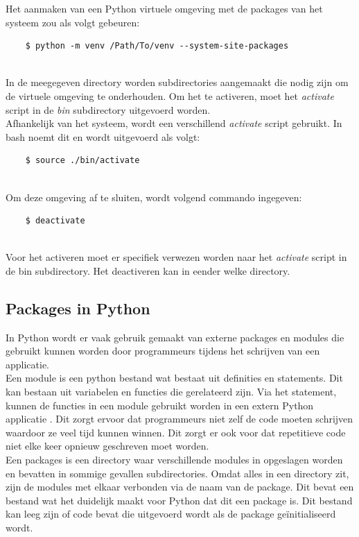 Het aanmaken van een Python virtuele omgeving met de packages van het systeem zou als volgt gebeuren:
\begin{lstlisting}
    $ python -m venv /Path/To/venv --system-site-packages
    
\end{lstlisting}

In de meegegeven directory worden subdirectories aangemaakt die nodig zijn om de virtuele omgeving te onderhouden. Om het te activeren, moet het \textit{activate} script in de \textit{bin} subdirectory uitgevoerd worden. \autocite{PSF2024} \\
Afhankelijk van het systeem, wordt een verschillend \textit{activate} script gebruikt. In bash noemt dit  en wordt uitgevoerd als volgt:
\begin{lstlisting}
    $ source ./bin/activate
    
\end{lstlisting}

Om deze omgeving af te sluiten, wordt volgend commando ingegeven:
\begin{lstlisting}
    $ deactivate
    
\end{lstlisting}

Voor het activeren moet er specifiek verwezen worden naar het \textit{activate} script in de bin subdirectory. Het deactiveren kan in eender welke directory.

\subsection{Packages in Python}
In Python wordt er vaak gebruik gemaakt van externe packages en modules die gebruikt kunnen worden door programmeurs tijdens het schrijven van een applicatie. \\
Een module is een python bestand wat bestaat uit definities en statements. Dit kan bestaan uit variabelen en functies die gerelateerd zijn. Via het  statement, kunnen de functies in een module gebruikt worden in een extern Python applicatie \autocite{Singh2024}. Dit zorgt ervoor dat programmeurs niet zelf de code moeten schrijven waardoor ze veel tijd kunnen winnen. Dit zorgt er ook voor dat repetitieve code niet elke keer opnieuw geschreven moet worden.\\

Een packages is een directory waar verschillende modules in opgeslagen worden en bevatten in sommige gevallen subdirectories. Omdat alles in een directory zit, zijn de modules met elkaar verbonden via de naam van de package. Dit bevat een  bestand wat het duidelijk maakt voor Python dat dit een package is. Dit bestand kan leeg zijn of code bevat die uitgevoerd wordt als de package geïnitialiseerd wordt. \autocite{Udacity2021} \\

